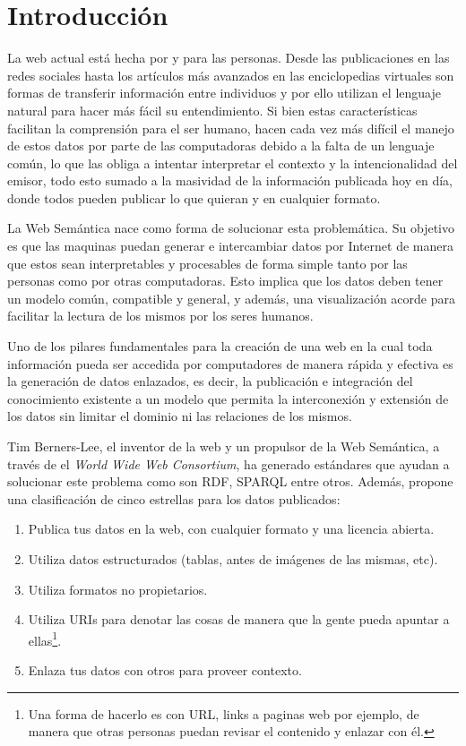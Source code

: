 
\chapter{Introducción}

La web actual está hecha por y para las personas. Desde las publicaciones en las
redes sociales hasta los artículos más avanzados en las enciclopedias virtuales
son formas de transferir información entre individuos y por ello utilizan el
lenguaje natural para hacer más fácil su entendimiento. Si bien estas
características facilitan la comprensión para el ser humano, hacen cada
vez más difícil el manejo de estos datos por parte de las computadoras debido a
la falta de un lenguaje común, lo que las obliga a intentar interpretar el
contexto y la intencionalidad del emisor, todo esto sumado a la masividad de la
información publicada hoy en día, donde todos pueden publicar lo que quieran y
en cualquier formato.

La Web Semántica nace como forma de solucionar esta problemática.
Su objetivo es que las maquinas puedan generar e intercambiar datos por Internet 
de manera que estos sean interpretables y procesables de forma simple tanto por
las personas como por otras computadoras.
Esto implica que los datos deben tener un modelo común, compatible y general,
y además, una visualización acorde para facilitar la lectura de los mismos por
los seres humanos.

Uno de los pilares fundamentales para la creación de una web en la cual toda
información pueda ser accedida por computadores de manera rápida y efectiva es
la generación de datos enlazados, es decir, la publicación e integración del 
conocimiento existente a un modelo que permita la interconexión y extensión de
los datos sin limitar el dominio ni las relaciones de los mismos.

Tim Berners-Lee, el inventor de la web y un propulsor de la Web Semántica,
a través de el \emph{World Wide Web Consortium}, ha generado estándares que
ayudan a solucionar este problema como son RDF, SPARQL entre otros.
Además, propone una clasificación de cinco estrellas para los datos publicados:
\begin{enumerate}
  \item
    Publica tus datos en la web, con cualquier formato y una licencia abierta.
  \item
    Utiliza datos estructurados (tablas, antes de imágenes de las mismas, etc).
  \item
    Utiliza formatos no propietarios.
  \item
    Utiliza URIs para denotar las cosas de manera que la gente pueda apuntar a
    ellas\footnote{
    Una forma de hacerlo es con URL, links a paginas web por ejemplo, de manera
    que otras personas puedan revisar el contenido y enlazar con él.}.
  \item
    Enlaza tus datos con otros para proveer contexto.
\end{enumerate}

